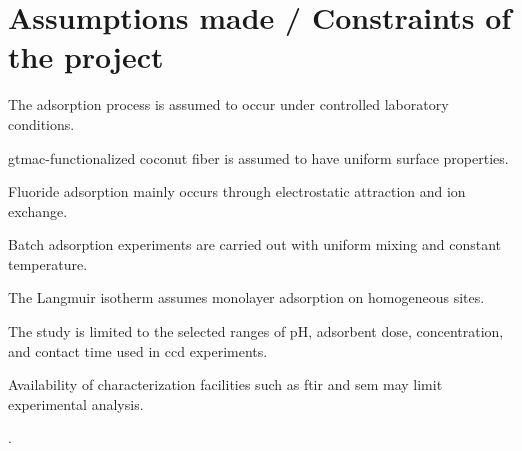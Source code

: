 \section[Assumptions made / Constraints of the project]{\textbf{Assumptions made / Constraints of the project}}

The adsorption process is assumed to occur under controlled laboratory conditions.  

\gls{gtmac}-functionalized coconut fiber is assumed to have uniform surface properties.  

Fluoride adsorption mainly occurs through electrostatic attraction and ion exchange.  

Batch adsorption experiments are carried out with uniform mixing and constant temperature.  

The Langmuir isotherm assumes monolayer adsorption on homogeneous sites.  

The study is limited to the selected ranges of pH, adsorbent dose, concentration, and contact time used in \gls{ccd} experiments.  

Availability of characterization facilities such as \gls{ftir} and \gls{sem} may limit experimental analysis. 

%

.